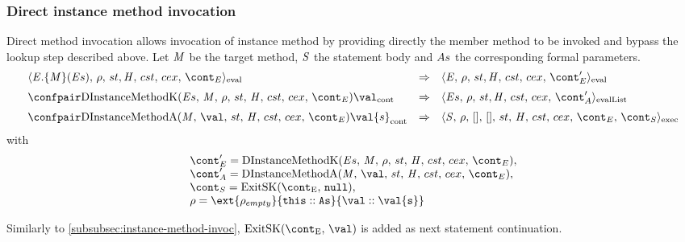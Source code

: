 \documentclass{article}
\begin{document}
\subsubsection{Direct instance method invocation}
\label{subsubsec:direct-instance-method-invoc}
Direct method invocation allows invocation of instance method by providing directly the member method to be invoked and bypass the lookup step described above. Let $\mathit{M}$ be the target method, $\mathit{S}$ the statement body and $As$ the corresponding formal parameters.
\newcommand{\DInstanceMethodInvocation}[3]{#1.\{#2\}(#3)}
\newcommand{\DInstanceMethodK}{\mathrm{DInstanceMethodK}(\expressionsmeta,\,\membermeta,\,\env,\,\strace,\,\handler,\,\cstrace,\,\cex,\,\econt)}
\newcommand{\DInstanceMethodA}{\mathrm{DInstanceMethodA}(\membermeta,\,\val,\,\strace,\,\handler,\,\cstrace,\,\cex,\,\econt)}
\[
  \begin{array}{lcl}
	\cesktrans{
		\evalconf{\DInstanceMethodInvocation{\expressionmeta}{\membermeta}{\expressionsmeta}}{\env}{\strace}{\cstrace}{\cex}{\econt}}{
		\evalconf{\expressionmeta}{\env}{\strace}{\cstrace}{\cex}{\econt'}}
	\\[2mm]

	\cesktrans{
		\contconf{\DInstanceMethodK}{\val}}{
		\evallistconf{\expressionsmeta}{\env}{\strace}{\cstrace}{\cex}{\acont'}}
	\\[2mm]

	\cesktrans{
		\contconf{\DInstanceMethodA}{\val{s}}}{
		\execconf{\stmt}{\env}{[]}{[]}{\handler}{\cstrace}{\cex}{\econt}{\scont}}
  \end{array}
\]
with
\[
\begin{array}{l}
	\econt' = \DInstanceMethodK,\\
	\acont' = \DInstanceMethodA,\\
	\scont = \ExitSK{\tt{null}},\\
	\env = \ext{\env_{empty}}{\this :: \formals}{\val :: \val{s}}
\end{array}
\]

\noindent
Similarly to \ref{subsubsec:instance-method-invoc}, $\ExitSK{\val}$ is added as next statement continuation.
\end{document}
